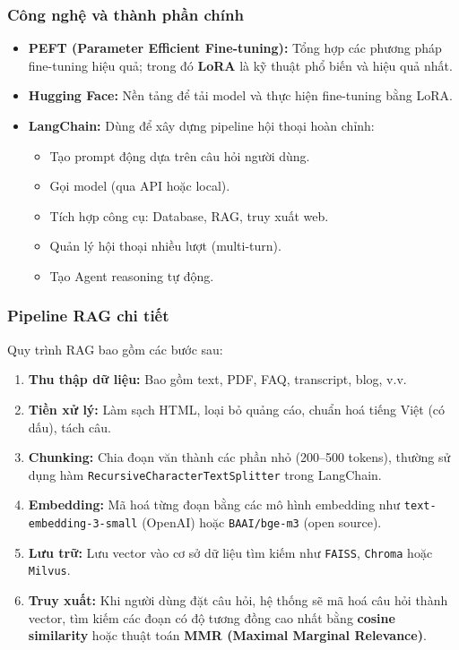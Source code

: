 \subsubsection{Công nghệ và thành phần chính}
\begin{itemize}
    \item \textbf{PEFT (Parameter Efficient Fine-tuning):} Tổng hợp các phương pháp fine-tuning hiệu quả; trong đó \textbf{LoRA} là kỹ thuật phổ biến và hiệu quả nhất.
    \item \textbf{Hugging Face:} Nền tảng để tải model và thực hiện fine-tuning bằng LoRA.
    \item \textbf{LangChain:} Dùng để xây dựng pipeline hội thoại hoàn chỉnh:
    \begin{itemize}
        \item Tạo prompt động dựa trên câu hỏi người dùng.
        \item Gọi model (qua API hoặc local).
        \item Tích hợp công cụ: Database, RAG, truy xuất web.
        \item Quản lý hội thoại nhiều lượt (multi-turn).
        \item Tạo Agent reasoning tự động.
    \end{itemize}
\end{itemize}


\subsubsection{Pipeline RAG chi tiết}
Quy trình RAG bao gồm các bước sau:
\begin{enumerate}[label=\textbf{(\alph*)}, leftmargin=2cm, itemsep=4pt]
\item \textbf{Thu thập dữ liệu:} Bao gồm text, PDF, FAQ, transcript, blog, v.v.
\item \textbf{Tiền xử lý:} Làm sạch HTML, loại bỏ quảng cáo, chuẩn hoá tiếng Việt (có dấu), tách câu.
\item \textbf{Chunking:} Chia đoạn văn thành các phần nhỏ (200--500 tokens), thường sử dụng hàm \texttt{RecursiveCharacterTextSplitter} trong LangChain.
\item \textbf{Embedding:} Mã hoá từng đoạn bằng các mô hình embedding như \texttt{text-embedding-3-small} (OpenAI) hoặc \texttt{BAAI/bge-m3} (open source).
\item \textbf{Lưu trữ:} Lưu vector vào cơ sở dữ liệu tìm kiếm như \texttt{FAISS}, \texttt{Chroma} hoặc \texttt{Milvus}.
\item \textbf{Truy xuất:} Khi người dùng đặt câu hỏi, hệ thống sẽ mã hoá câu hỏi thành vector, tìm kiếm các đoạn có độ tương đồng cao nhất bằng \textbf{cosine similarity} hoặc thuật toán \textbf{MMR (Maximal Marginal Relevance)}.
\end{enumerate}



